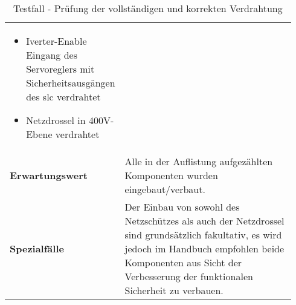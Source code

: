 \documentclass[../../../Bachelorarbeit.tex]{subfiles}
\begin{document}
\begin{table}[H]
\begin{tabular}{ p{0.34\linewidth}  p{0.6\linewidth} }
{\begin{itemize}[noitemsep,topsep=0pt,parsep=0pt,partopsep=0pt,leftmargin=*]
                                                \item Iverter-Enable Eingang des Servoreglers mit Sicherheitsausgängen des \acs{slc} verdrahtet
                                                \item Netzdrossel in 400V-Ebene verdrahtet
                                            \end{itemize}} \\
        \textbf{Erwartungswert}         & Alle in der Auflistung aufgezählten Komponenten wurden eingebaut/verbaut. \\
        \textbf{Spezialfälle}           & Der Einbau von sowohl des Netzschützes als auch der Netzdrossel sind grundsätzlich fakultativ, es wird jedoch im Handbuch empfohlen beide Komponenten aus Sicht der Verbesserung der funktionalen Sicherheit zu verbauen. \\ \hline
    \end{tabular}
    \caption[\acs{tf} - Verdrahtungsprüfung]{Testfall - Prüfung der vollständigen und korrekten Verdrahtung}
    \label{tab:my-table61}
\end{table}
\end{document}
